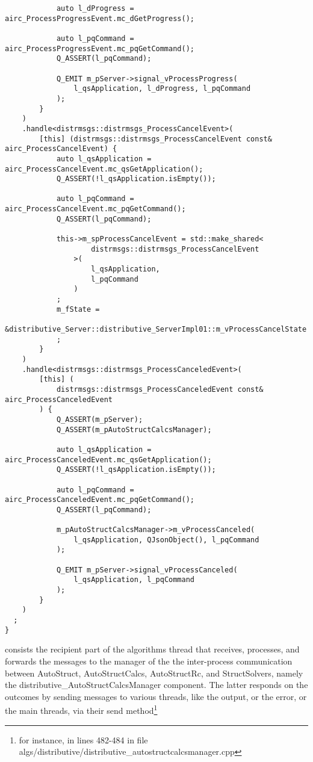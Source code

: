 \begin{verbatim}
            auto l_dProgress =  airc_ProcessProgressEvent.mc_dGetProgress();

            auto l_pqCommand = airc_ProcessProgressEvent.mc_pqGetCommand();
            Q_ASSERT(l_pqCommand);

            Q_EMIT m_pServer->signal_vProcessProgress(
                l_qsApplication, l_dProgress, l_pqCommand
            );
        }
    )
    .handle<distrmsgs::distrmsgs_ProcessCancelEvent>(
        [this] (distrmsgs::distrmsgs_ProcessCancelEvent const& airc_ProcessCancelEvent) {
            auto l_qsApplication = airc_ProcessCancelEvent.mc_qsGetApplication();
            Q_ASSERT(!l_qsApplication.isEmpty());

            auto l_pqCommand = airc_ProcessCancelEvent.mc_pqGetCommand();
            Q_ASSERT(l_pqCommand);

            this->m_spProcessCancelEvent = std::make_shared<
                    distrmsgs::distrmsgs_ProcessCancelEvent
                >(
                    l_qsApplication,
                    l_pqCommand
                )
            ;
            m_fState = 
                &distributive_Server::distributive_ServerImpl01::m_vProcessCancelState
            ;
        }
    )
    .handle<distrmsgs::distrmsgs_ProcessCanceledEvent>(
        [this] (
            distrmsgs::distrmsgs_ProcessCanceledEvent const& airc_ProcessCanceledEvent
        ) {
            Q_ASSERT(m_pServer);
            Q_ASSERT(m_pAutoStructCalcsManager);

            auto l_qsApplication = airc_ProcessCanceledEvent.mc_qsGetApplication();
            Q_ASSERT(!l_qsApplication.isEmpty());

            auto l_pqCommand = airc_ProcessCanceledEvent.mc_pqGetCommand();
            Q_ASSERT(l_pqCommand);

            m_pAutoStructCalcsManager->m_vProcessCanceled(
                l_qsApplication, QJsonObject(), l_pqCommand
            );

            Q_EMIT m_pServer->signal_vProcessCanceled(
                l_qsApplication, l_pqCommand
            );
        }
    )
  ;
}

\end{verbatim}
consists the recipient part of the algorithms thread that receives, processes, and forwards the messages to the manager of the the inter-process communication between AutoStruct, AutoStructCalcs, AutoStructRc, and StructSolvers, namely the distributive\_AutoStructCalcsManager component. The latter responds on the outcomes by sending messages to various threads, like the output, or the error, or the main threads, via their send method\footnote{for instance, in lines 482-484 in file algs/distributive/distributive\_autostructcalcsmanager.cpp}
